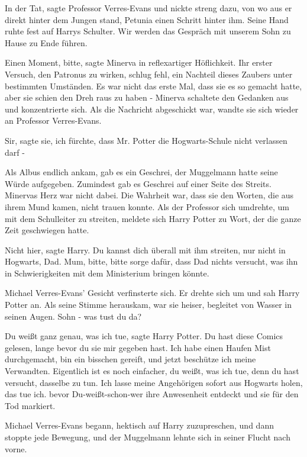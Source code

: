 \glqq In der Tat\grqq{}, sagte Professor Verres-Evans und nickte streng dazu,
von wo aus er direkt hinter dem Jungen stand, Petunia einen Schritt hinter ihm.
Seine Hand ruhte fest auf Harrys Schulter. \glqq Wir werden das Gespräch mit
unserem Sohn zu Hause zu Ende führen.\grqq{}

\glqq Einen Moment, bitte\grqq{}, sagte Minerva in reflexartiger Höflichkeit.
Ihr erster Versuch, den Patronus zu wirken, schlug fehl, ein Nachteil dieses
Zaubers unter bestimmten Umständen. Es war nicht das erste Mal, dass sie es so
gemacht hatte, aber sie schien den Dreh raus zu haben - Minerva schaltete den
Gedanken aus und konzentrierte sich. Als die Nachricht abgeschickt war, wandte
sie sich wieder an Professor Verres-Evans.

\glqq Sir\grqq{}, sagte sie, \glqq ich fürchte, dass Mr. Potter die
Hogwarts-Schule nicht verlassen darf -\grqq{}

Als Albus endlich ankam, gab es ein Geschrei, der Muggelmann hatte seine Würde
aufgegeben. Zumindest gab es Geschrei auf einer Seite des Streits. Minervas Herz
war nicht dabei. Die Wahrheit war, dass sie den Worten, die aus ihrem Mund
kamen, nicht trauen konnte. Als der Professor sich umdrehte, um mit dem
Schulleiter zu streiten, meldete sich Harry Potter zu Wort, der die ganze Zeit
geschwiegen hatte.

\glqq Nicht hier\grqq{}, sagte Harry. \glqq Du kannst dich überall mit ihm
streiten, nur nicht in Hogwarts, Dad. Mum, bitte, bitte sorge dafür, dass Dad
nichts versucht, was ihn in Schwierigkeiten mit dem Ministerium bringen
könnte.\grqq{}

Michael Verres-Evans' Gesicht verfinsterte sich. Er drehte sich um und sah Harry
Potter an. Als seine Stimme herauskam, war sie heiser, begleitet von Wasser in
seinen Augen. \glqq Sohn - was tust du da?\grqq{}

\glqq Du weißt ganz genau, was ich tue\grqq{}, sagte Harry Potter. \glqq Du hast
diese Comics gelesen, lange bevor du sie mir gegeben hast. Ich habe einen Haufen
Mist durchgemacht, bin ein bisschen gereift, und jetzt beschütze ich meine
Verwandten. Eigentlich ist es noch einfacher, du weißt, was ich tue, denn du
hast versucht, dasselbe zu tun. Ich lasse meine Angehörigen sofort aus Hogwarts
holen, das tue ich. bevor Du-weißt-schon-wer ihre Anwesenheit entdeckt und sie
für den Tod markiert.\grqq{}

Michael Verres-Evans begann, hektisch auf Harry zuzupreschen, und dann stoppte
jede Bewegung, und der Muggelmann lehnte sich in seiner Flucht nach vorne.

